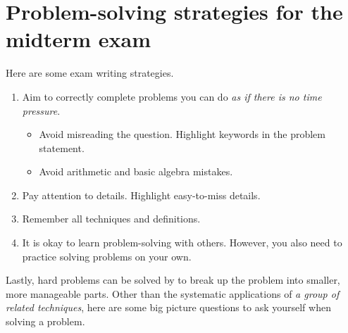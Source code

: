 \documentclass[../main.tex]{subfiles}
\begin{document}
 \section{Problem-solving strategies for the midterm exam}

Here are some exam writing strategies.

\begin{enumerate}
  \item Aim to correctly complete problems you can do \emph{as if there is no time pressure}.
  \begin{itemize}
    \item Avoid misreading the question. Highlight keywords in the problem statement.

    \item Avoid arithmetic and basic algebra mistakes.
  \end{itemize}

  \item Pay attention to details. Highlight easy-to-miss details. 

  \item Remember all techniques and definitions.




    
  \item It is okay to learn problem-solving with others. However, you also need to practice solving problems on your own.
\end{enumerate}

\bigskip

\faStar{} Lastly, hard problems can be solved by  to break up the problem into smaller, more manageable parts.  Other than the systematic applications of \emph{a group of related techniques}, here are some big picture questions to ask yourself when solving a problem.
\end{document}
